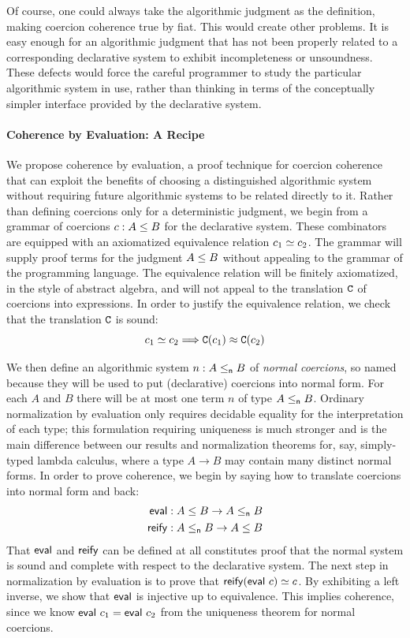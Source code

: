 \documentclass[acmsmall,screen]{acmart}
\begin{document}
Of course, one could always take the algorithmic judgment as the definition,
making coercion coherence true by fiat. This would create other problems. It is
easy enough for an algorithmic judgment that has not been properly related to
a corresponding declarative system to exhibit incompleteness or unsoundness.
These defects would force the careful programmer to study the particular
algorithmic system in use, rather than thinking in terms of the conceptually
simpler interface provided by the declarative system.

\paragraph{Coherence by Evaluation: A Recipe}
We propose coherence by evaluation, a proof technique for coercion coherence 
that can exploit the benefits of choosing a distinguished algorithmic system
without requiring future algorithmic systems to be related directly to it.
Rather than defining coercions only for a deterministic judgment, we begin from
a grammar of coercions \(c : A \leq B\) for the declarative system. These
combinators are equipped with an axiomatized equivalence relation
\(c_1 \simeq c_2\).  The grammar will supply proof terms
for the judgment \(A \leq B\) without appealing to the grammar of the
programming language.  The equivalence relation will be finitely axiomatized, in
the style of abstract algebra, and will not appeal to the translation
\(\texttt{C}\) of coercions into expressions. In order to justify the equivalence
relation, we check that the translation \(\texttt{C}\) is sound:
\[
  c_1 \simeq c_2 \Longrightarrow
  \texttt{C}(c_1) \approx \texttt{C}(c_2)
\]

We then define an algorithmic system \(n : A \leq_{\mathsf{n}} B\) of \emph{normal coercions},
so named because they will be used to put (declarative) coercions into normal form.
For each \(A\) and \(B\) there will be at most one term \(n\) of type \(A \leq_{\mathsf{n}} B\).
Ordinary normalization by evaluation only requires decidable equality for the
interpretation of each type; this formulation requiring uniqueness is much stronger
and is the main difference between our results and normalization theorems for,
say, simply-typed lambda calculus, where a type \(A \to B\) may contain many
distinct normal forms.
In order to prove coherence, we begin by
saying how to translate coercions into normal form and back:
\begin{align*}
  \mathsf{eval} &: A \leq B \to A \leq_{\mathsf{n}} B \\
  \mathsf{reify} &: A \leq_{\mathsf{n}} B \to A \leq B
\end{align*}
That \(\mathsf{eval}\) and \(\mathsf{reify}\) can be defined at all constitutes proof that
the normal system is sound and complete with respect to the declarative system.
The next step in normalization by evaluation is to prove that
\(\mathsf{reify} (\mathsf{eval}\ c) \simeq c\).
By exhibiting a left inverse, we show that \(\mathsf{eval}\) is injective up to
equivalence. This implies coherence, since we know \(\mathsf{eval}\ c_1 = \mathsf{eval}\ c_2\)
from the uniqueness theorem for normal coercions.
\end{document}
